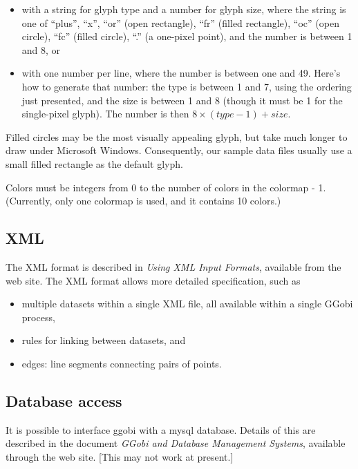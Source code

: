\documentclass[11pt]{article}
\begin{document}
\begin{itemize}
\item with a string for glyph type and a number for glyph size, where
the string is one of ``plus'', ``x'', ``or'' (open rectangle), ``fr''
(filled rectangle), ``oc'' (open circle), ``fc'' (filled circle),
``.'' (a one-pixel point), and the number is between 1 and 8, or
\item with one number per line, where the number is between one and
49.  Here's how to generate that number: the type is between 1 and 7,
using the ordering just presented, and the size is between 1 and 8
(though it must be 1 for the single-pixel glyph).  The number is then
$8 \times (type-1) + size$.
\end{itemize}

Filled circles may be the most visually appealing glyph, but take
much longer to draw under Microsoft Windows.  Consequently, our
sample data files usually use a small filled rectangle as the default
glyph.

Colors must be integers from 0 to the number of colors in
the colormap - 1.  (Currently, only one colormap is used, and it
contains 10 colors.)

\subsection {XML}
\label{slbl:XML}

The XML format is described in {\em Using XML Input Formats},
available from the web site.  The XML format allows more detailed
specification, such as

\begin{itemize}
\item multiple datasets within a single XML file, all available within
      a single GGobi process,
\item rules for linking between datasets, and
\item edges: line segments connecting pairs of points.
\end{itemize}

\subsection {Database access}
\label{slbl:MySQL}

It is possible to interface ggobi with a mysql database. Details of
this are described in the document {\em GGobi and Database Management
Systems}, available through the web site.  [This may not work at
present.]
\end{document}
